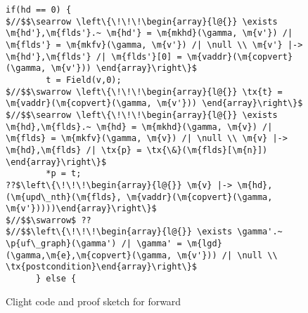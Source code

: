 \begin{figure*}[!ht]
\begin{lstlisting}[multicols=2]
      if(hd == 0) {
$//$$\searrow \left\{\!\!\!\begin{array}{l@{}} \exists \m{hd'},\m{flds'}.~ \m{hd'} = \m{mkhd}(\gamma, \m{v'}) /| \m{flds'} = \m{mkfv}(\gamma, \m{v'}) /| \null \\ \m{v'} |-> \m{hd'},\m{flds'} /| \m{flds'}[0] = \m{vaddr}(\m{copvert}(\gamma, \m{v'})) \end{array}\right\}$
        t = Field(v,0);
$//$$\swarrow \left\{\!\!\!\begin{array}{l@{}} \tx{t} = \m{vaddr}(\m{copvert}(\gamma, \m{v'})) \end{array}\right\}$
$//$$\searrow \left\{\!\!\!\begin{array}{l@{}} \exists \m{hd},\m{flds}.~ \m{hd} = \m{mkhd}(\gamma, \m{v}) /| \m{flds} = \m{mkfv}(\gamma, \m{v}) /| \null \\ \m{v} |-> \m{hd},\m{flds} /| \tx{p} = \tx{\&}(\m{flds}[\m{n}]) \end{array}\right\}$
        *p = t;
??$\left\{\!\!\!\begin{array}{l@{}} \m{v} |-> \m{hd},(\m{upd\_nth}(\m{flds}, \m{vaddr}(\m{copvert}(\gamma, \m{v'}))))\end{array}\right\}$
$//$$\swarrow$ ??
$//$$\left\{\!\!\!\begin{array}{l@{}} \exists \gamma'.~ \p{uf\_graph}(\gamma') /| \gamma' = \m{lgd}(\gamma,\m{e},\m{copvert}(\gamma, \m{v'})) /| \null \\ \tx{postcondition}\end{array}\right\}$
      } else {
\end{lstlisting}
\vspace{-0.4em}
\caption{Clight code and proof sketch for forward}
\label{fig:forward}
\vspace{-1em}
\end{figure*}

